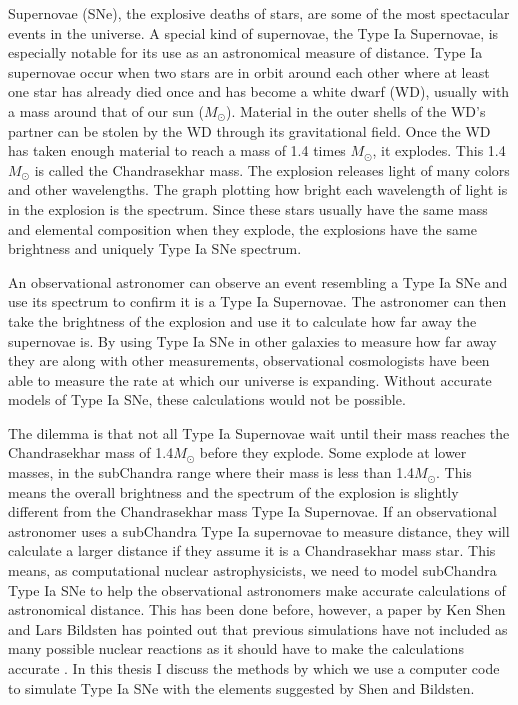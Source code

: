 \documentclass[preprint]{aastex62}
\begin{document}
  Supernovae (SNe), the explosive deaths of stars, are some of the most spectacular events in the universe. A special kind of supernovae, the Type Ia Supernovae, is especially notable for its use as an astronomical measure of distance. Type Ia supernovae occur when two stars are in orbit around each other where at least one star has already died once and has become a white dwarf (WD), usually with a mass around that of our sun ($M_{\odot}$). Material in the outer shells of the WD's partner can be stolen by the WD through its gravitational field. Once the WD has taken enough material to reach a mass of 1.4 times $M_{\odot}$, it explodes. This 1.4$M_{\odot}$ is called the Chandrasekhar mass. The explosion releases light of many colors and other wavelengths. The graph plotting how bright each wavelength of light is in the explosion is the spectrum. Since these stars usually have the same mass and elemental composition when they explode, the explosions have the same brightness and uniquely Type Ia SNe spectrum. 
  
  An observational astronomer can observe an event resembling a Type Ia SNe and use its spectrum to confirm it is a Type Ia Supernovae. The astronomer can then take the brightness of the explosion and use it to calculate how far away the supernovae is. By using Type Ia SNe in other galaxies to measure how far away they are along with other measurements, observational cosmologists have been able to measure the rate at which our universe is expanding. Without accurate models of Type Ia SNe, these calculations would not be possible. 
  
  The dilemma is that not all Type Ia Supernovae wait until their mass reaches  the Chandrasekhar mass of 1.4$M_{\odot}$ before they explode. Some explode at lower masses, in the subChandra range where their mass is less than 1.4$M_{\odot}$. This means the overall brightness and the spectrum of the explosion is slightly different from the Chandrasekhar mass Type Ia Supernovae. If an observational astronomer uses a subChandra Type Ia supernovae to measure distance, they will calculate a larger distance if they assume it is a Chandrasekhar mass star. This means, as computational nuclear astrophysicists, we need to model subChandra Type Ia SNe to help the observational astronomers make accurate calculations of astronomical distance. This has been done before, however, a paper by Ken Shen and Lars Bildsten has pointed out that previous simulations have not included as many possible nuclear reactions as it should have to make the calculations accurate \citep{shenNbildsten}. In this thesis I discuss the methods by which we use a computer code to simulate Type Ia SNe with the elements suggested by Shen and Bildsten. 
\end{document}
